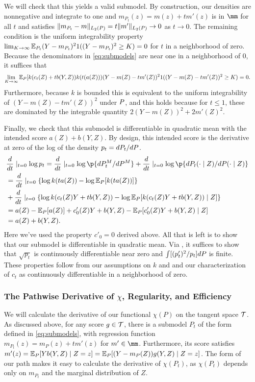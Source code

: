 We will check that this yields a valid submodel. By construction, our densities are nonnegative and integrate to one
and $m_{P_t}(z) = m(z) + tm'(z)$ is in $\mm$ for all $t$ and satisfies $\norm{m_{P_t} - m}_{L_2(\P)} = t\norm{m'}_{L_2(\P)} \to 0$ as $t \to 0$.
The remaining condition is the uniform integrability property $\lim_{K \to \infty}\E_{P_t}(Y-m_{P_t})^2 1((Y-m_{P_t})^2 \ge K)=0$ for $t$ in a neighborhood of zero.
Because the denominators in \eqref{eq:submodels} are near one in a neighborhood of $0$, it suffices that
\[ \lim_{K \to \infty}\E_P[ k(c_t(Z) + t b(Y,Z))k(t(a(Z))) (Y - m(Z)-tm'(Z))^2 1((Y-m(Z) - tm'(Z))^2 \ge K) = 0. \]
Furthermore, because $k$ is bounded this is equivalent to the uniform integrability of $(Y - m(Z)-tm'(Z))^2$ under $\P$,
and this holds because for $t \le 1$, these are dominated by the integrable quantity $2(Y-m(Z))^2 + 2 m'(Z)^2$.

Finally, we check that this submodel is differentiable in quadratic mean with the intended score  $a(Z) + b(Y,Z)$.
By design, this intended score is the derivative at zero of the log of the density $p_t = d\P_t/d\P$.
\begin{align*}
&\frac{d}{dt}\mid_{t=0} \log p_t =\frac{d}{dt}\mid_{t=0} \log \p{ d\P_t^M / d\P^M } +\frac{d}{dt}\mid_{t=0} \log\p{ d\P_t(\cdot \mid Z)/d\P(\cdot \mid Z) } \\ 
&= \frac{d}{dt}\mid_{t=0} \set*{\log k(ta(Z)) - \log \E_P[ k(ta(Z))]} \\
& + \frac{d}{dt}\mid_{t=0}\set*{\log k(c_t(Z)Y + tb(Y,Z)) - \log \E_P[ k(c_t(Z)Y + t b(Y,Z))  \mid Z] } \\ 
&=a(Z) - \E_P[ a(Z) ] + c_0'(Z)Y + b(Y,Z) - \E_P[ c_0'(Z)Y + b(Y,Z)  \mid Z]  \\ 
&=a(Z) + b(Y,Z).
\end{align*}
Here we've used the property $c'_0=0$ derived above. All that is left is to show that our submodel is differentiable in
quadratic mean. Via \citet[Lemma 1.8]{van2000semiparametric}, 
it suffices to show that $\sqrt{p_t}$ is continuously differentiable near zero and
$\int [(p'_t)^2 / p_t] d\P$ is finite. These properties follow from our assumptions on $k$ and
and our characterization of $c_t$ as continuously differentiable in a neighborhood of zero.

\subsubsection{The Pathwise Derivative of $\chi$, Regularity, and Efficiency}
\label{sec:pathwise-derivative}
We will calculate the derivative of our functional $\chi(P)$ on the tangent space $\mathcal{T}$.
As discussed above, for any score $g \in \mathcal{T}$, there is a submodel $P_t$ of the form defined in \eqref{eq:submodels}, with regression function $m_{P_t}(z) = m_P(z) + t m'(z)$ for $m' \in \mm$. Furthermore, its score satisfies $m'(z) = \E_P[Y b(Y,Z) \mid Z=z]=\E_P[(Y-m_P(Z))g(Y,Z) \mid Z=z]$. 
The form of our path makes it easy to calculate the derivative of $\chi(P_t)$, as $\chi(P_t)$ depends only on $m_{P_t}$ and the marginal distribution of $Z$.

